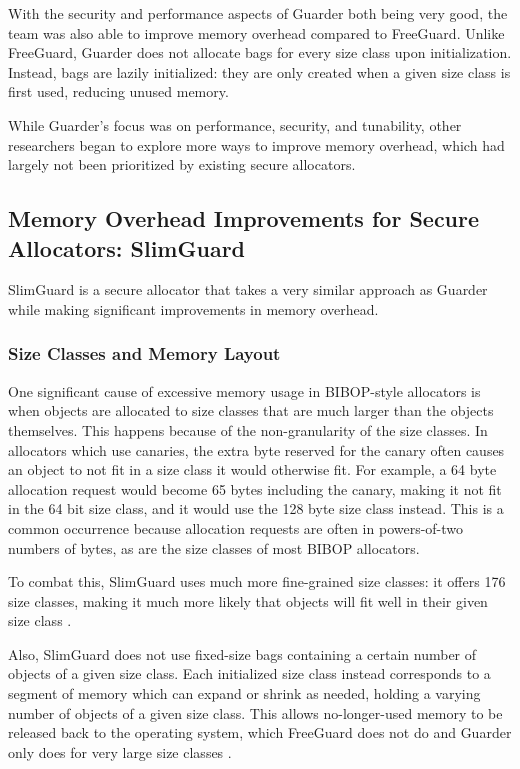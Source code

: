 \documentclass[conference]{IEEEtran}
\begin{document}
With the security and performance aspects of Guarder both being very good, the team was also able to improve memory overhead compared to FreeGuard.
Unlike FreeGuard, Guarder does not allocate bags for every size class upon initialization.
Instead, bags are lazily initialized: they are only created when a given size class is first used, reducing unused memory.

While Guarder's focus was on performance, security, and tunability, other researchers began to explore more ways to improve memory overhead, which had largely not been prioritized by existing secure allocators.

\subsection{Memory Overhead Improvements for Secure Allocators: SlimGuard}

SlimGuard is a secure allocator that takes a very similar approach as Guarder while making significant improvements in memory overhead.

\subsubsection{Size Classes and Memory Layout}
One significant cause of excessive memory usage in BIBOP-style allocators is when objects are allocated to size classes that are much larger than the objects themselves.
This happens because of the non-granularity of the size classes.
In allocators which use canaries, the extra byte reserved for the canary often causes an object to not fit in a size class it would otherwise fit.
For example, a 64 byte allocation request would become 65 bytes including the canary, making it not fit in the 64 bit size class, and it would use the 128 byte size class instead.
This is a common occurrence because allocation requests are often in powers-of-two numbers of bytes, as are the size classes of most BIBOP allocators.

To combat this, SlimGuard uses much more fine-grained size classes: it offers 176 size classes, making it much more likely that objects will fit well in their given size class \cite{slimguard}.

Also, SlimGuard does not use fixed-size bags containing a certain number of objects of a given size class.
Each initialized size class instead corresponds to a segment of memory which can expand or shrink as needed, holding a varying number of objects of a given size class.
This allows no-longer-used memory to be released back to the operating system, which FreeGuard does not do and Guarder only does for very large size classes \cite{guarder} \cite{slimguard}.
\end{document}

